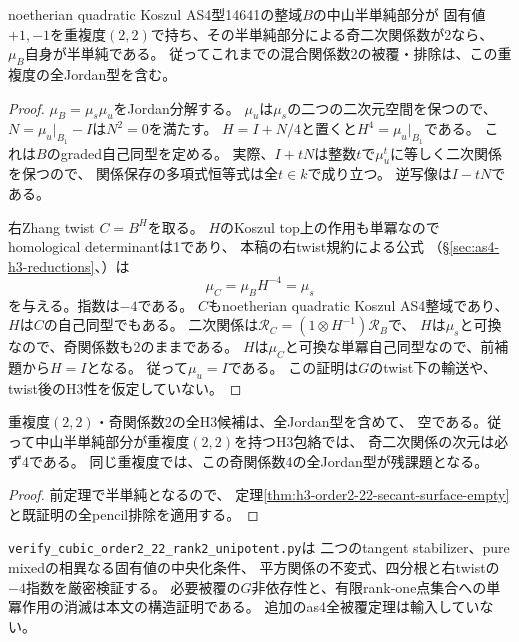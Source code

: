 \begin{theorem}\label{thm:h3-order2-22-rank2-no-Jordan}
noetherian quadratic Koszul AS4型14641の整域$B$の中山半単純部分が
固有値$+1,-1$を重複度$(2,2)$で持ち、その半単純部分による奇二次関係数が2なら、
$\mu_B$自身が半単純である。
従ってこれまでの混合関係数2の被覆・排除は、この重複度の全Jordan型を含む。
\end{theorem}
\begin{proof}
$\mu_B=\mu_s\mu_u$をJordan分解する。
$\mu_u$は$\mu_s$の二つの二次元空間を保つので、
$N=\mu_u|_{B_1}-I$は$N^2=0$を満たす。
$H=I+N/4$と置くと$H^4=\mu_u|_{B_1}$である。
これは$B$のgraded自己同型を定める。
実際、$I+tN$は整数$t$で$\mu_u^t$に等しく二次関係を保つので、
関係保存の多項式恒等式は全$t\in k$で成り立つ。
逆写像は$I-tN$である。

右Zhang twist $C=B^H$を取る。
$H$のKoszul top上の作用も単冪なのでhomological determinantは1であり、
本稿の右twist規約による公式
（\S\ref{sec:as4-h3-reductions}、\cite[Theorem 0.3]{RRZ}）は
\[
 \mu_C=\mu_BH^{-4}=\mu_s
\]
を与える。指数は$-4$である。
$C$もnoetherian quadratic Koszul AS4整域であり、
$H$は$C$の自己同型でもある。
二次関係は$\mathcal R_C=(1\otimes H^{-1})\mathcal R_B$で、
$H$は$\mu_s$と可換なので、奇関係数も2のままである。
$H$は$\mu_C$と可換な単冪自己同型なので、前補題から$H=I$となる。
従って$\mu_u=I$である。
この証明は$G$のtwist下の輸送や、twist後のH3性を仮定していない。
\end{proof}

\begin{corollary}\label{cor:h3-order2-22-rank2-all-Jordan-coverage}
重複度$(2,2)$・奇関係数2の全H3候補は、全Jordan型を含めて、
空である。従って中山半単純部分が重複度$(2,2)$を持つH3包絡では、
奇二次関係の次元は必ず4である。
同じ重複度では、この奇関係数4の全Jordan型が残課題となる。
\end{corollary}
\begin{proof}
前定理で半単純となるので、
定理\ref{thm:h3-order2-22-secant-surface-empty}と既証明の全pencil排除を適用する。
\end{proof}

\texttt{verify\_cubic\_order2\_22\_rank2\_unipotent.py}は
二つのtangent stabilizer、pure mixedの相異なる固有値の中央化条件、
平方関係の不変式、四分根と右twistの$-4$指数を厳密検証する。
必要被覆の$G$非依存性と、有限rank-one点集合への単冪作用の消滅は本文の構造証明である。
追加のas4全被覆定理は輸入していない。
